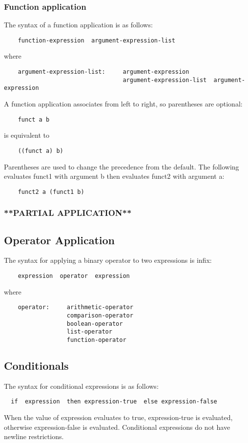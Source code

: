     \subsubsection{Function application}
    The syntax of a function application is as follows: 
    \begin{verbatim}
    function-expression  argument-expression-list \end{verbatim} 
    where
    \begin{verbatim}
    argument-expression-list:     argument-expression
                                  argument-expression-list  argument-expression
    \end{verbatim} 
A function application associates from left to right, so parentheses are optional: 
    \begin{verbatim}
    funct a b
    \end{verbatim}
    is equivalent to
    \begin{verbatim}
    ((funct a) b) 
    \end{verbatim}
    Parentheses are used to change the precedence from the default. The following evaluates funct1 with argument b then evaluates funct2 with argument a:
    \begin{verbatim}
    funct2 a (funct1 b)
    \end{verbatim}   

  \subsubsection{**PARTIAL APPLICATION**}
  

\subsection{Operator Application}
  The syntax for applying a binary operator to two expressions is infix:
    \begin{verbatim}
    expression  operator  expression \end{verbatim} 
    where
    \begin{verbatim}
    operator:     arithmetic-operator
                  comparison-operator
                  boolean-operator
                  list-operator
                  function-operator \end{verbatim} 

\subsection{Conditionals}
  The syntax for conditional expressions is as follows:
  \begin{verbatim}
  if  expression  then expression-true  else expression-false \end{verbatim} 
  When the value of expression evaluates to true, expression-true is evaluated, otherwise expression-false is evaluated. Conditional expressions do not have newline restrictions.

